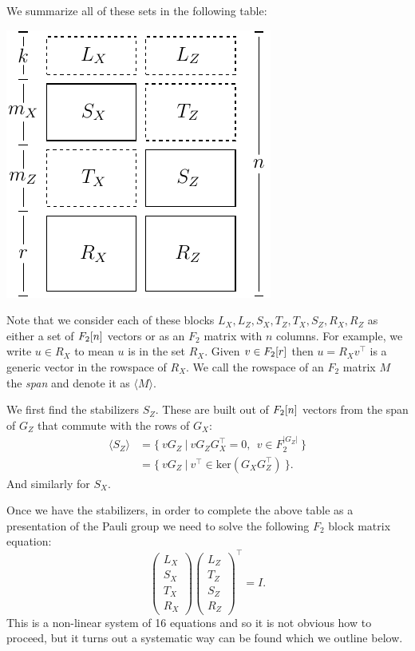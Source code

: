 \documentclass[12pt]{article}
\begin{document}
We summarize all of these sets
in the following table:
\def\Im{\mathrm{im}}
\def\Ker{\mathrm{ker}}
\def\Span#1{\langle #1 \rangle}
\begin{center}
\includegraphics[]{pic-symplectic.pdf}
\end{center}

Note that we consider each of these blocks 
$L_X, L_Z, S_X, T_Z, T_X, S_Z, R_X, R_Z$
as either a set of $F_2[n]$ vectors or as an $F_2$ matrix
with $n$ columns.
For example, we write $u\in R_X$ to mean $u$ is in
the set $R_X$. 
Given $v\in F_2[r]$ then $u = R_X v^\top$ is
a generic vector in the rowspace of $R_X.$
We call the rowspace of an $F_2$
matrix $M$ the \emph{span} and denote 
it as $\Span{M}.$

We first find the stabilizers $S_Z$.
These are built out of $F_2[n]$ vectors from the span of $G_Z$
that commute with the rows of $G_X:$
\begin{align*}
    \Span{S_Z} &= \{\  vG_Z \ |\  v G_Z G_X^\top = 0, \ \ v \in F_2^{|G_Z|}\ \} \\
               &= \{\  vG_Z \ |\  v^\top \in \Ker(G_X G_Z^\top)  \ \}.
\end{align*}
And similarly for $S_X.$

Once we have the stabilizers, in order to
complete the above table as a presentation
of the Pauli group we need to solve the
following $F_2$ block matrix equation:
$$
\left( \begin{array}{l}
L_X\\
S_X\\
T_X\\
R_X
\end{array} \right)
\left( \begin{array}{l}
L_Z\\
T_Z\\
S_Z\\
R_Z
\end{array} \right)^\top =
I.
$$
This is a non-linear system of 16 equations and so it
is not obvious how to proceed, but it turns out a
systematic way can be found which we outline below.
\end{document}
